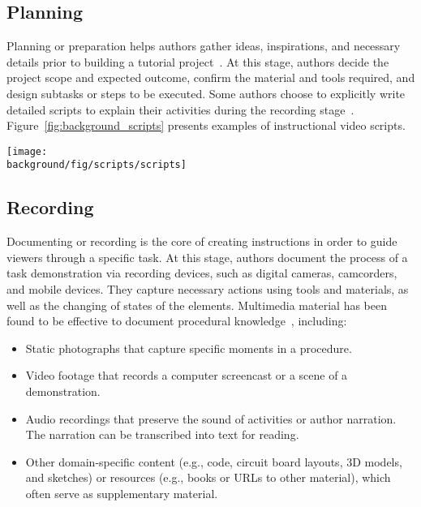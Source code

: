 \subsection{Planning}
Planning or preparation helps authors gather ideas, inspirations, and necessary details prior to building a tutorial project~\cite{Torrey:2007he}. At this stage, authors decide the project scope and expected outcome, confirm the material and tools required, and design subtasks or steps to be executed. Some authors choose to explicitly write detailed scripts to explain their activities during the recording stage~\cite{Chi:2013:DGC:2501988.2502052}. Figure~\ref{fig:background_scripts} presents examples of instructional video scripts.

\begin{figure*}[th!]
  \centering
  \texttt{[image: \\background/fig/scripts/scripts]}
  \caption{Example scripts for instructional videos about a) food safety~\protect\cite{WisconsinFoodSafetyScript} and b) cooking ~\protect\cite{SouthernIllinoisScript}. Each includes video shot(s) and narration, some with additional notes on the actions. High-level structure can also be specified, such as ``introduction'' and ``conclusion.''}
  \label{fig:background_scripts}
\end{figure*}

\subsection{Recording}
Documenting or recording is the core of creating instructions in order to guide viewers through a specific task. At this stage, authors document the process of a task demonstration via recording devices, such as digital cameras, camcorders, and mobile devices. They capture necessary actions using tools and materials, as well as the changing of states of the elements.
%
Multimedia material has been found to be effective to document procedural knowledge~\cite{Kuznetsov:2010:REA:1868914.1868950,Wakkary:2015:TAH:2702123.2702550,Moreno2007}, including:

\begin{itemize}
  \item Static photographs that capture specific moments in a procedure.
  \item Video footage that records a computer screencast or a scene of a demonstration.
  \item Audio recordings that preserve the sound of activities or author narration. The narration can be transcribed into text for reading.
  \item Other domain-specific content (e.g., code, circuit board layouts, 3D models, and sketches) or resources (e.g., books or URLs to other material), which often serve as supplementary material.
\end{itemize}

